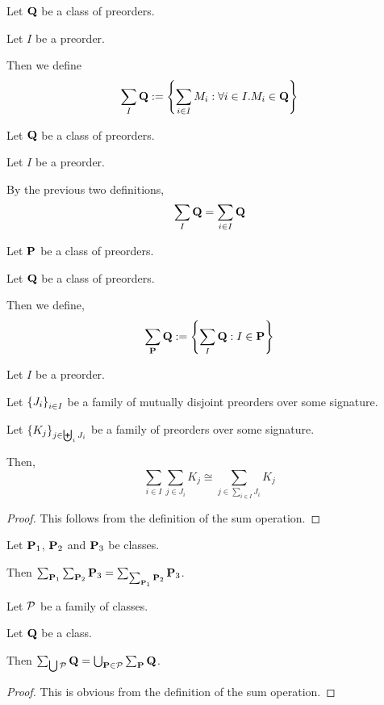 \begin{definition}
  Let $\mathbf{Q}$ be a class of preorders.

  Let $I$ be a preorder.

  Then we define
  \[
    \sum_{I}{\mathbf{Q}} := \left\{ {\sum_{i \in I}{M_i} : \forall i \in I. M_i \in \mathbf{Q}} \right\}
  \]
\end{definition}

\begin{note}
  Let $\mathbf{Q}$ be a class of preorders.

  Let $I$ be a preorder.

  By the previous two definitions,
  \[
    \sum_{I}{\mathbf{Q}} = \sum_{i \in I}{\mathbf{Q}}
  \]
\end{note}

\begin{definition}
  Let $\mathbf{P}$ be a class of preorders.

  Let $\mathbf{Q}$ be a class of preorders.

  Then we define,
  \[
    \sum_{\mathbf{P}}{\mathbf{Q}} := \left\{ {\sum_{I}{\mathbf{Q}} : I \in \mathbf{P}} \right\}
  \]
\end{definition}

\begin{lemma}
  Let $I$ be a preorder.

  Let $\left\{ {J_i} \right\}_{i \in I}$ be a family of mutually disjoint preorders
  over some signature.

  Let $\left\{ {K_j} \right\}_{j \in \biguplus_i J_i}$ be a family of preorders
  over some signature.

  Then,
  \[
    \sum_{i \in I}{\sum_{j \in J_i}{K_j}} \cong \sum_{j \in \sum_{i \in I}{J_i}}{K_j}
  \]
\end{lemma}

\begin{proof}
  This follows from the definition of the sum operation.
\end{proof}

\begin{corollary}
  Let $\mathbf{P}_1$, $\mathbf{P}_2$ and $\mathbf{P}_3$ be classes.

  Then $\sum_{\mathbf{P}_1}{\sum_{\mathbf{P}_2}{\mathbf{P}_3}} = \sum_{\sum_{\mathbf{P}_1}{\mathbf{P}_2}}{\mathbf{P}_3}$.
\end{corollary}

\begin{lemma}
  Let $\mathcal{P}$ be a family of classes.

  Let $\mathbf{Q}$ be a class.

  Then $\sum_{\bigcup \mathcal{P}}{\mathbf{Q}} = \bigcup_{\mathbf{P} \in \mathcal{P}}{\sum_{\mathbf{P}}{\mathbf{Q}}}$.
\end{lemma}

\begin{proof}
  This is obvious from the definition of the sum operation.
\end{proof}